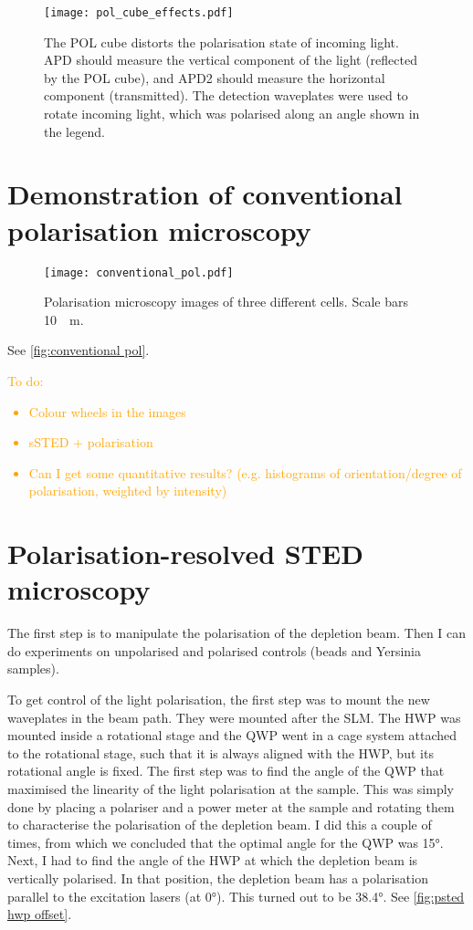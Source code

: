 \begin{figure}
	\centering
	\texttt{[image: pol\_cube\_effects.pdf]}
	\caption{The POL cube distorts the polarisation state of incoming light. APD should measure the vertical component of the light (reflected by the POL cube), and APD2 should measure the horizontal component (transmitted). The detection waveplates were used to rotate incoming light, which was polarised along an angle shown in the legend.}
	\label{fig:pol cube effects}
\end{figure}

\section{Demonstration of conventional polarisation microscopy}

\begin{figure}
	\centering
	\texttt{[image: conventional\_pol.pdf]}
	\caption{
		Polarisation microscopy images of three different cells. Scale bars \SI{10}{\mu m}.
	}
	\label{fig:conventional pol}
\end{figure}

See \autoref{fig:conventional pol}.
\textcolor{orange}{
	To do:
	\begin{itemize}
		\item Colour wheels in the images
		\item sSTED + polarisation
		\item Can I get some quantitative results? (e.g. histograms of orientation/degree of polarisation, weighted by intensity)
	\end{itemize}
} 

\section{Polarisation-resolved STED microscopy}

 The first step is to manipulate the polarisation of the depletion beam. Then I can do experiments on unpolarised and polarised controls (beads and Yersinia samples).

To get control of the light polarisation, the first step was to mount the new waveplates in the beam path. They were mounted after the SLM. The HWP was mounted inside a rotational stage and the QWP went in a cage system attached to the rotational stage, such that it is always aligned with the HWP, but its rotational angle is fixed. The first step was to find the angle of the QWP that maximised the linearity of the light polarisation at the sample. This was simply done by placing a polariser and a power meter at the sample and rotating them to characterise the polarisation of the depletion beam. I did this a couple of times, from which we concluded that the optimal angle for the QWP was 15°.  Next, I had to find the angle of the HWP at which the depletion beam is vertically polarised. In that position, the depletion beam has a polarisation parallel to the excitation lasers (at 0°). This turned out to be 38.4°. See \autoref{fig:psted hwp offset}.


